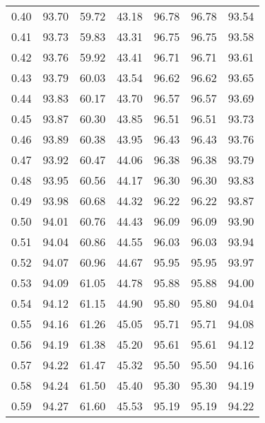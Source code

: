 \begin{tabular}{|c|c|c|c|c|c|c|}
      0.40 &     93.70 &     59.72 &      43.18 &   96.78 &      96.78 &         93.54 \\
      0.41 &     93.73 &     59.83 &      43.31 &   96.75 &      96.75 &         93.58 \\
      0.42 &     93.76 &     59.92 &      43.41 &   96.71 &      96.71 &         93.61 \\
      0.43 &     93.79 &     60.03 &      43.54 &   96.62 &      96.62 &         93.65 \\
      0.44 &     93.83 &     60.17 &      43.70 &   96.57 &      96.57 &         93.69 \\
      0.45 &     93.87 &     60.30 &      43.85 &   96.51 &      96.51 &         93.73 \\
      0.46 &     93.89 &     60.38 &      43.95 &   96.43 &      96.43 &         93.76 \\
      0.47 &     93.92 &     60.47 &      44.06 &   96.38 &      96.38 &         93.79 \\
      0.48 &     93.95 &     60.56 &      44.17 &   96.30 &      96.30 &         93.83 \\
      0.49 &     93.98 &     60.68 &      44.32 &   96.22 &      96.22 &         93.87 \\
      0.50 &     94.01 &     60.76 &      44.43 &   96.09 &      96.09 &         93.90 \\
      0.51 &     94.04 &     60.86 &      44.55 &   96.03 &      96.03 &         93.94 \\
      0.52 &     94.07 &     60.96 &      44.67 &   95.95 &      95.95 &         93.97 \\
      0.53 &     94.09 &     61.05 &      44.78 &   95.88 &      95.88 &         94.00 \\
      0.54 &     94.12 &     61.15 &      44.90 &   95.80 &      95.80 &         94.04 \\
      0.55 &     94.16 &     61.26 &      45.05 &   95.71 &      95.71 &         94.08 \\
      0.56 &     94.19 &     61.38 &      45.20 &   95.61 &      95.61 &         94.12 \\
      0.57 &     94.22 &     61.47 &      45.32 &   95.50 &      95.50 &         94.16 \\
      0.58 &     94.24 &     61.50 &      45.40 &   95.30 &      95.30 &         94.19 \\
      0.59 &     94.27 &     61.60 &      45.53 &   95.19 &      95.19 &         94.22 \\

\end{tabular}

